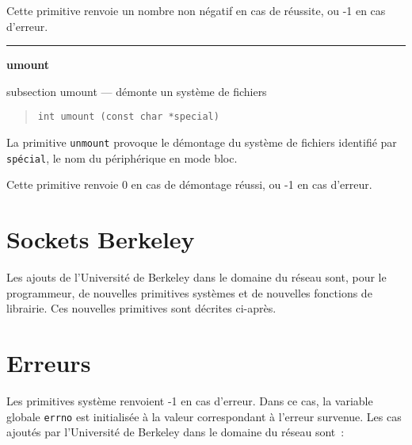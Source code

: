\documentclass [twoside] {report}
\newcommand {\primitive} [1]
    {
	\phantomsection
	{\large \bf #1}
	\addcontentsline {toc} {subsection} {#1}
    }
\newcommand {\separation}
    {
	\vspace {5mm}
	\nopagebreak
	\hrule
    }
\begin{document}
Cette primitive renvoie un nombre non négatif en
cas de réussite, ou -1 en cas d'erreur.




\separation
\primitive {umount} --- démonte un système de fichiers

\begin {quote}
\begin {verbatim}
int umount (const char *special)
\end{verbatim}
\end {quote}

La primitive {\tt unmount} provoque le démontage du
système de fichiers identifié par {\tt spécial}, le nom du
périphérique en mode bloc.

Cette primitive renvoie 0 en cas de démontage
réussi, ou -1 en cas d'erreur.





\section {Sockets Berkeley}

Les ajouts de l'Université de Berkeley dans le domaine du
réseau sont, pour le programmeur, de nouvelles primitives
systèmes et de nouvelles fonctions de librairie. Ces nouvelles
primitives sont décrites ci-après.

\section* {Erreurs}

Les primitives système renvoient -1 en cas d'erreur. Dans ce
cas, la variable globale {\tt errno} est initialisée à la
valeur correspondant à l'erreur survenue. Les cas ajoutés
par l'Université de Berkeley dans le domaine du réseau sont~:
\end{document}
